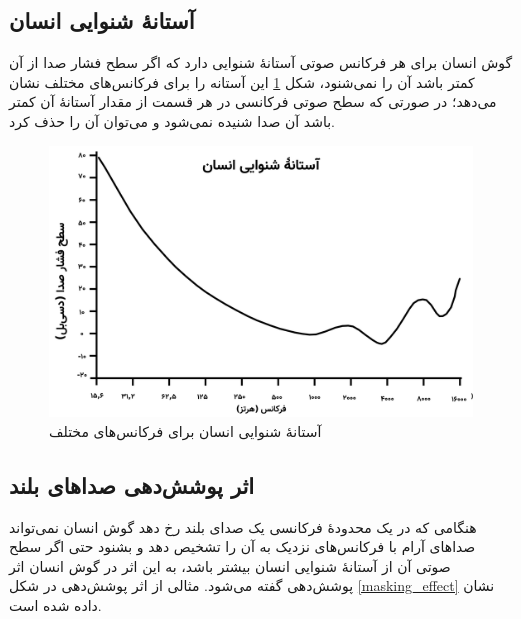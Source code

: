  \subsection{آستانهٔ شنوایی انسان}
 گوش انسان برای هر فرکانس صوتی آستانهٔ شنوایی دارد که اگر سطح فشار صدا از آن کمتر باشد آن را نمی‌شنود، 
 شکل 
 \ref{human_hearing}
 این آستانه را برای فرکانس‌های مختلف نشان می‌دهد؛ در صورتی که سطح صوتی فرکانسی در هر قسمت از مقدار آستانهٔ آن کمتر باشد آن صدا شنیده نمی‌شود و 
 می‌توان آن را حذف کرد.

 \begin{figure}[]
         \centering
         \includegraphics[width=\textwidth]{figs/human_hearing.png}
         \caption[آستانهٔ شنوایی انسان برای فرکانس‌های مختلف]{آستانهٔ شنوایی انسان برای فرکانس‌های مختلف \cite{percieved_human_hearing}}
         \label{human_hearing}
 \end{figure}
 \subsection{اثر پوشش‌دهی صداهای بلند}
 هنگامی که در یک محدودهٔ فرکانسی یک صدای بلند رخ دهد گوش انسان نمی‌تواند صداهای آرام با فرکانس‌های نزدیک به آن را تشخیص دهد و بشنود
 حتی اگر سطح صوتی آن از آستانهٔ شنوایی انسان بیشتر باشد، به این اثر در گوش انسان اثر پوشش‌دهی 
 گفته می‌شود. 
 مثالی از اثر پوشش‌دهی در شکل 
 \ref{masking_effect}
 نشان داده شده است. 

